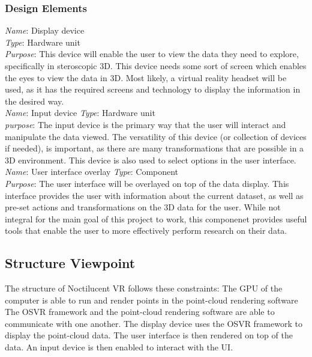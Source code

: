 \subsubsection{Design Elements}

        \textit{Name}: Display device\\
        \textit{Type}: Hardware unit\\
        \textit{Purpose}: This device will enable the user to view the data they need to explore, specifically in steroscopic 3D. 
        This device needs some sort of screen which enables the eyes to view the data in 3D. Most likely, a virtual reality headset
        will be used, as it has the required screens and technology to display the information in the desired way.\\
\newline
        \textit{Name}: Input device
        \textit{Type}: Hardware unit\\
        \textit{purpose}: The input device is the primary way that the user will interact and manipulate the data viewed. 
        The versatility of this device (or collection of devices if needed), is important, as there are many transformations
        that are possible in a 3D environment. This device is also used to select options in the user interface.\\
\newline
        \textit{Name}: User interface overlay
        \textit{Type}: Component\\
        \textit{Purpose}: The user interface will be overlayed on top of the data display. This interface provides
        the user with information about the current dataset, as well as pre-set actions and transformations on the 
        3D data for the user. While not integral for the main goal of this project to work, this componenet provides
        useful tools that enable the user to more effectively perform research on their data.

\subsection{Structure Viewpoint}

The structure of Noctilucent VR follows these constraints:
The GPU of the computer is able to run and render points in the point-cloud rendering software
The OSVR framework and the point-cloud rendering software are able to communicate with one another.
The display device uses the OSVR framework to display the point-cloud data.
The user interface is then rendered on top of the data.
An input device is then enabled to interact with the UI.

